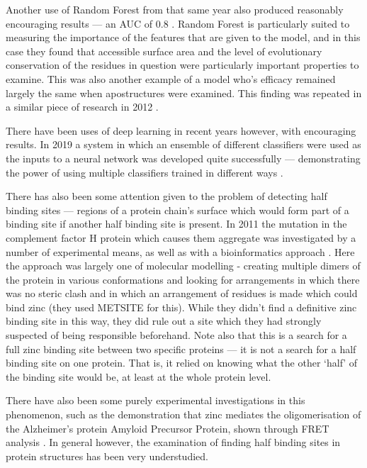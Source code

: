 Another use of Random Forest from that same year also produced reasonably encouraging results --- an AUC of 0.8 \cite{bordner2008}. Random Forest is particularly suited to measuring the importance of the features that are given to the model, and in this case they found that accessible surface area and the level of evolutionary conservation of the residues in question were particularly important properties to examine. This was also another example of a model who's efficacy remained largely the same when apostructures were examined. This finding was repeated in a similar piece of research in 2012 \cite{zheng2012}.

There have been uses of deep learning in recent years however, with encouraging results. In 2019 a system in which an ensemble of different classifiers were used as the inputs to a neural network was developed quite successfully --- demonstrating the power of using multiple classifiers trained in different ways \cite{li2019}.


There has also been some attention given to the problem of detecting half binding sites --- regions of a protein chain's surface which would form part of a binding site if another half binding site is present. In 2011 the mutation in the complement factor H protein which causes them aggregate was investigated by a number of experimental means, as well as with a bioinformatics approach \cite{nan2011zinc}. Here the approach was largely one of molecular modelling - creating multiple dimers of the protein in various conformations and looking for arrangements in which there was no steric clash and in which an arrangement of residues is made which could bind zinc (they used METSITE for this). While they didn't find a definitive zinc binding site in this way, they did rule out a site which they had strongly suspected of being responsible beforehand. Note also that this is a search for a full zinc binding site between two specific proteins --- it is not a search for a half binding site on one protein. That is, it relied on knowing what the other `half' of the binding site would be, at least at the whole protein level.

There have also been some purely experimental investigations in this phenomenon, such as the demonstration that zinc mediates the oligomerisation of the Alzheimer's protein Amyloid Precursor Protein, shown through FRET analysis \cite{mayer2014novel}. In general however, the examination of finding half binding sites in protein structures has been very understudied.

